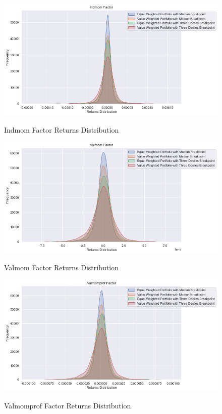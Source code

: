\begin{figure}[H]
	\caption{Indmom Factor Returns Distribution}
	\centering
	\includegraphics[scale=.63]{../../output/figures/indmom.png}
	\label{fig:indmom}
\end{figure}

\begin{figure}[H]
	\caption{Valmom Factor Returns Distribution}
	\centering
	\includegraphics[scale=.63]{../../output/figures/valmom.png}
	\label{fig:valmom}
\end{figure}

\begin{figure}[H]
	\caption{Valmomprof Factor Returns Distribution}
	\centering
	\includegraphics[scale=.63]{../../output/figures/valmomprof.png}
	\label{fig:valmomprof}
\end{figure}

